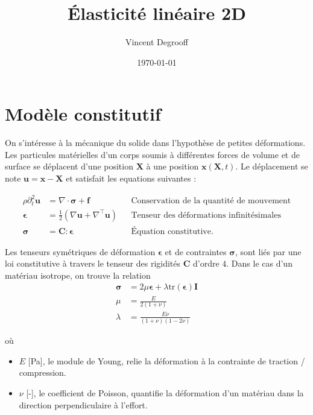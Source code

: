 \documentclass[12pt]{article}
\title{Élasticité linéaire 2D}
\author{Vincent Degrooff}
\date{\today}
\newcommand{\uu}{\mathbf{u}}
\newcommand{\stress}{\boldsymbol{\sigma}}
\newcommand{\strain}{\boldsymbol{\epsilon}}
\begin{document}
\maketitle

\tableofcontents
\newpage

\section{Modèle constitutif}

On s'intéresse à la mécanique du solide dans l'hypothèse de petites 
déformations. Les particules matérielles d'un corps soumis à différentes forces 
de volume et de surface se déplacent d'une position $\mathbf{X}$ à une position 
$\mathbf{x}(\mathbf{X},t)$. Le déplacement se note $\uu=\mathbf{x}-\mathbf{X}$ 
et satisfait les equations suivantes :

\begin{align}
    \rho \partial^2_t \uu &= \nabla \cdot \stress + \mathbf{f} 
        && \text{Conservation de la quantité de mouvement} \label{eq:momentum}\\
    \strain &= \frac{1}{2}\left(\nabla\uu + \nabla^\intercal \uu\right)
        && \text{Tenseur des déformations infinitésimales} \label{eq:strain}\\
    \stress &= \mathbf{C} : \strain && \text{Équation constitutive} 
        \label{eq:stress}.
\end{align}

Les tenseurs symétriques de déformation $\strain$ et de contraintes $\stress$, 
sont liés par une loi constitutive à travers le tenseur des rigidités 
$\mathbf{C}$ d'ordre $4$. Dans le cas d'un matériau isotrope, on trouve la 
relation
\begin{align}
    \stress &= 2\mu \strain + \lambda \mathrm{tr}(\strain) \mathbf{I} 
    \label{eq:constitutive}\\
    \mu &= \frac{E}{2(1 + \nu)}\\
    \lambda &= \frac{E\nu}{(1+\nu)(1 - 2\nu)}
\end{align}

où 
\begin{itemize}
    \item $E$ [Pa], le module de Young, relie la déformation à la contrainte de 
    traction / compression.
    \item $\nu$ [-], le coefficient de Poisson, quantifie la déformation 
    d'un matériau dans la direction perpendiculaire à l'effort.
\end{itemize}
\end{document}
